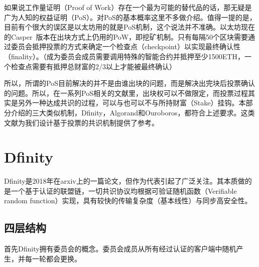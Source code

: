 如果说工作量证明（Proof of Work）存在一个最为可能的替代品的话，那无疑是广为人知的权益证明（PoS）。对PoS的基本概率这里不多做介绍。值得一提的是，目前有个很大的误区是以太坊用的就是PoS机制，这个说法并不准确。以太坊现在的Casper~\cite{buterin2017casper}版本在出块方式上仍用的PoW，即挖矿机制。只有每隔50个区块需要通过委员会抵押投票的方式来确定一个检查点（checkpoint）以实现最终确认性（finality）。（成为委员会成员需要调用特殊的智能合约并抵押至少1500ETH，一个检查点需要有抵押总财富的2/3以上才能被最终确认）

所以，所谓的PoS目前解决的并不是由谁出块的问题，而是解决出完块后投票确认的问题。所以，在一系列PoS相关的文献里，出块权可以不做限定，而投票过程其实是另外一种达成共识的过程，可以与也可以不与所持财富（Stake）挂钩。本部分介绍的三大类似机制，Dfinity，Algorand和Ouroboros，都符合上述要求。这类文献为我们设计基于投票的共识机制提供了参考。

\section{Dfinity}
Dfinity是2018年在arxiv上的一篇论文，但作为代表引起了广泛关注。其本质做的是一个基于认证的联盟链，一切共识协议均根据可验证随机函数（Verifiable random function）实现，具有较快的传输复杂度（基本线性）与同步高安全性。
\subsection{四层结构}
首先Dfinity拥有委员会的概念。委员会成员从所有经过认证的客户端中随机产生，并每一轮都会更换。

